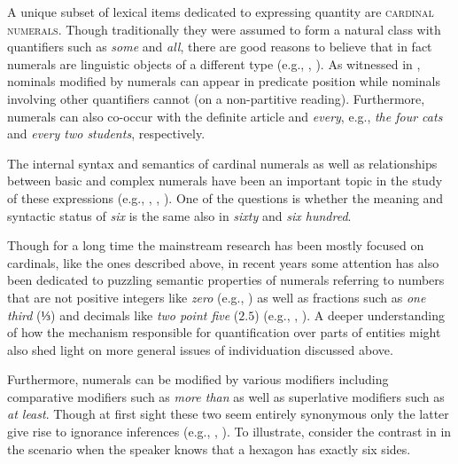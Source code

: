\documentclass[output=paper]{langscibook}
\begin{document}
\ea\label{doc-wag:ex:much}
\z
\z

\noindent A unique subset of lexical items dedicated to expressing quantity are \textsc{cardinal numerals}. Though traditionally they were assumed to form a natural class with quantifiers such as \textit{some} and \textit{all}, there are good reasons to believe that in fact numerals are linguistic objects of a different type (e.g., \citealt[Ch.~2]{landman2004indefinites}, \citealt[Ch.~2]{rothstein2017semantics}). As witnessed in , nominals modified by numerals can appear in predicate position while nominals involving other quantifiers cannot (on a non-partitive reading). Furthermore, numerals can also co-occur with the definite article and \textit{every}, e.g., \textit{the four cats} and \textit{every two students}, respectively. 

\ea\label{doc-wag:ex:numerals}
\z
\z

\noindent The internal syntax and semantics of cardinal numerals as well as relationships between basic and complex numerals have been an important topic in the study of these expressions (e.g., \citealt{rothstein2013fregean, ionin_matushansky2018cardinals, wagiel_caha2020universal}, , ). One of the questions is whether the meaning and syntactic status of \textit{six} is the same also in \textit{sixty} and \textit{six hundred}.

Though for a long time the mainstream research has been mostly focused on cardinals, like the ones described above, in recent years some attention has also been dedicated to puzzling semantic properties of numerals referring to numbers that are not positive integers like \textit{zero} (e.g., \citealt{bylinina_nouwen2018zero}) as well as fractions such as \textit{one third} (⅓) and decimals like \textit{two point five} ($2.5$) (e.g., \citealt{salmon1997}, ). A deeper understanding of how the mechanism responsible for quantification over parts of entities might also shed light on more general issues of individuation discussed above.

Furthermore, numerals can be modified by various modifiers including comparative modifiers such as \textit{more than} as well as superlative modifiers such as \textit{at least}. Though at first sight these two seem entirely synonymous only the latter give rise to ignorance inferences (e.g., \citealt{krifka1999least, nouwen2010two}, ). To illustrate, consider the contrast in  in the scenario when the speaker knows that a hexagon has exactly six sides.
\end{document}
